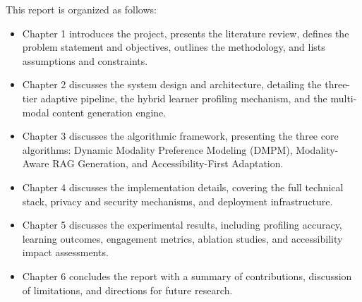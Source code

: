 This report is organized as follows:
\begin{itemize}
	\item Chapter 1 introduces the project, presents the literature review, defines the problem statement and objectives, outlines the methodology, and lists assumptions and constraints.
	\item Chapter 2 discusses the system design and architecture, detailing the three-tier adaptive pipeline, the hybrid learner profiling mechanism, and the multi-modal content generation engine.
	\item Chapter 3 discusses the algorithmic framework, presenting the three core algorithms: Dynamic Modality Preference Modeling (DMPM), Modality-Aware RAG Generation, and Accessibility-First Adaptation.
	\item Chapter 4 discusses the implementation details, covering the full technical stack, privacy and security mechanisms, and deployment infrastructure.
	\item Chapter 5 discusses the experimental results, including profiling accuracy, learning outcomes, engagement metrics, ablation studies, and accessibility impact assessments.
	\item Chapter 6 concludes the report with a summary of contributions, discussion of limitations, and directions for future research.
\end{itemize}